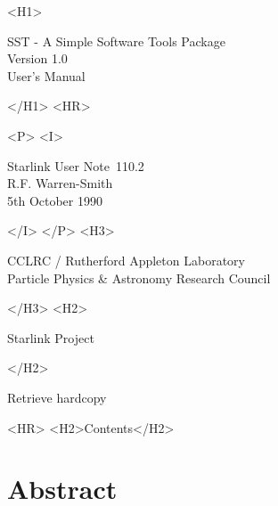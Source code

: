 \documentclass[twoside,11pt]{article}
\newcommand{\stardoccategory}  {Starlink User Note}
\newcommand{\stardocsource}    {sun\stardocnumber}
\newcommand{\stardocnumber}    {110.2}
\newcommand{\stardocauthors}   {R.F. Warren-Smith}
\newcommand{\stardocdate}      {5th October 1990}
\newcommand{\stardoctitle}     {SST - A Simple Software Tools Package}
\newcommand{\stardocversion}   {Version 1.0}
\newcommand{\stardocmanual}    {User's Manual}
\newcommand{\htmladdnormallink}[2]{#1}
\newcommand{\htmladdimg}[1]{}
\newcommand{\htmlref}[2]{#1}
\newcommand{\htmladdtonavigation}[1]{}
\newcommand{\xlabel}[1]{}
\renewcommand{\_}{\texttt{\symbol{95}}}
\begin{document}
\begin{htmlonly}
   \xlabel{}
   \begin{rawhtml} <H1> \end{rawhtml}
      \stardoctitle\\
      \stardocversion\\
      \stardocmanual
   \begin{rawhtml} </H1> <HR> \end{rawhtml}


   \begin{rawhtml} <P> <I> \end{rawhtml}
   \stardoccategory\ \stardocnumber \\
   \stardocauthors \\
   \stardocdate
   \begin{rawhtml} </I> </P> <H3> \end{rawhtml}
      \htmladdnormallink{CCLRC / Rutherford Appleton Laboratory}
                        {http://www.cclrc.ac.uk} \\
      \htmladdnormallink{Particle Physics \& Astronomy Research Council}
                        {http://www.pparc.ac.uk} \\
   \begin{rawhtml} </H3> <H2> \end{rawhtml}
      \htmladdnormallink{Starlink Project}{http://www.starlink.ac.uk/}
   \begin{rawhtml} </H2> \end{rawhtml}
   \htmladdnormallink{\htmladdimg{source.gif} Retrieve hardcopy}
      {http://www.starlink.ac.uk/cgi-bin/hcserver?\stardocsource}\\

  \label{stardoccontents}
  \begin{rawhtml} 
    <HR>
    <H2>Contents</H2>
  \end{rawhtml}
  \htmladdtonavigation{\htmlref{\htmladdimg{contents_motif.gif}}
        {stardoccontents}}

  \section{\xlabel{abstract}Abstract}
\end{htmlonly}
\end{document}
